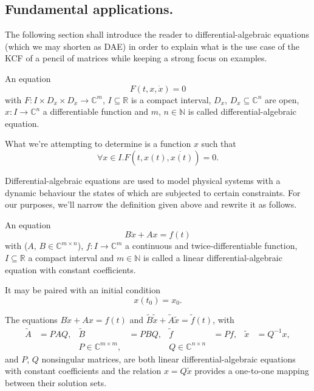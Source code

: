 \subsection*{Fundamental applications.}
The following section shall introduce the reader to differential-algebraic equations (which we may shorten as DAE) in
order to explain what is the use case of the KCF of a pencil of matrices while keeping a strong focus on examples.

\begin{definition} \cite[p. 3, Equation 1.1]{kunkel-mehrmann}\label{def:dae}
    An equation
    \[
        F(t, x, \dot{x}) = 0
    \]
    with \(F: I \times D_{x} \times D_{x} \rightarrow \mathbb{C}^m\), \(I \subseteq \mathbb{R}\) is a compact interval,
    \(D_{x}\), \(D_{x} \subseteq \mathbb{C}^n\) are open, \(x: I \rightarrow \mathbb{C}^n\) a differentiable function
    and \(m\), \(n \in \mathbb{N}\) is called differential-algebraic equation.

    What we're attempting to determine is a function \(x\) such that
    \[
        \forall x \in I. F(t, x(t), \dot{x(t)}) = 0.
    \]
\end{definition}

Differential-algebraic equations are used to model physical systems with a dynamic behaviour the states of which are
subjected to certain constraints. For our purposes, we'll narrow the definition given above and rewrite it as follows.
\begin{definition} \cite[p. 13, Equation 2.1]{kunkel-mehrmann}
    An equation
    \[
        B \dot{x} + Ax = f(t)
    \]
    with (\(A\), \(B \in \mathbb{C}^{m \times n}\)),
    \(f: I \rightarrow \mathbb{C}^m\) a continuous and twice-differentiable function, \(I \subseteq \mathbb{R}\) a
    compact interval and \(m \in \mathbb{N}\) is called a linear differential-algebraic equation with constant
    coefficients.

    It may be paired with an initial condition
    \[
        x(t_{0}) = x_{0}.
    \]
\end{definition}

\begin{remark}\cite[p. 13]{kunkel-mehrmann}
    The equations \(B \dot{x} + Ax = f(t)\) and \(\tilde{B} \tilde{\dot{x}} + \tilde{A}\tilde{x} = \tilde{f}(t)\), with
    \begin{align*}
        \tilde{A} &= PAQ, & \tilde{B} &= PBQ, & \tilde{f} &= Pf, & \tilde{x} &= Q^{-1}x, \\
        && P \in \mathbb{C}^{m \times m}, && Q \in \mathbb{C}^{n \times n}
    \end{align*}
    and \(P\), \(Q\) nonsingular matrices, are both linear differential-algebraic equations with constant coefficients and
    the relation \(x = Q\tilde{x}\) provides a one-to-one mapping between their solution sets.
\end{remark}


